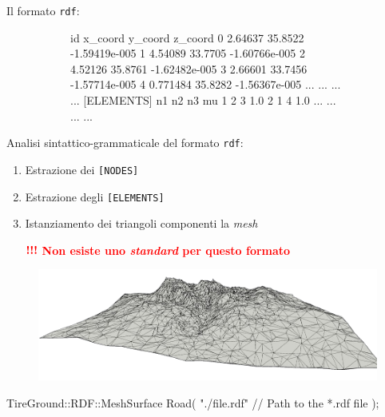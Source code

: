 \documentclass[xcolor=dvipsnames]{beamer} %
\begin{document}
\begin{frame}[fragile]
	\Large {Il formato \texttt{rdf}}:
	\begin{figure}
		\centering
		\begin{subfigure}{.5\linewidth}
\begin{pseudoc}
[NODES]
{ id x_coord y_coord z_coord }
0 2.64637 35.8522 -1.59419e-005 
1 4.54089 33.7705 -1.60766e-005 
2 4.52126 35.8761 -1.62482e-005 
3 2.66601 33.7456 -1.57714e-005 
4 0.771484 35.8282 -1.56367e-005 
... ... ... ...
[ELEMENTS]
{ n1 n2 n3 mu }
1 2 3 1.0 
2 1 4 1.0 
... ... ... ...
\end{pseudoc}
		\end{subfigure}
	\end{figure}
	
\end{frame}

\begin{frame}[fragile]
	\Large{Analisi sintattico-grammaticale del formato \texttt{rdf}}:
	\normalsize
	\begin{enumerate}
		\item Estrazione dei \texttt{[NODES]}
		\item Estrazione degli \texttt{[ELEMENTS]}
		\item Istanziamento dei triangoli componenti la \textit{mesh}
		\item[$\textcolor{red}{\textbf{!!!}}$] \textcolor{red}{\textbf{ Non esiste uno \textit{standard} per questo formato}}
	\end{enumerate}
\begin{figure}
	\centering
	\includegraphics[width=0.7\linewidth]{../Figures/mesh}
\end{figure}
\vspace{-0.3cm}
\begin{pseudoc}
TireGround::RDF::MeshSurface Road(
"./file.rdf" // Path to the *.rdf file
);
\end{pseudoc}
\end{frame}
\end{document}
